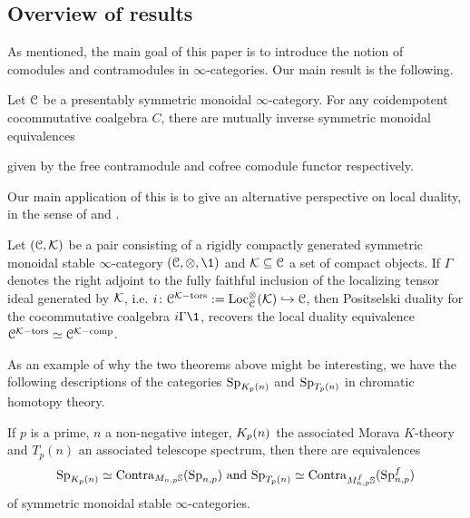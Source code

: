 \subsection*{Overview of results}

As mentioned, the main goal of this paper is to introduce the notion of comodules and contramodules in $\infty$-categories. Our main result is the following. 

\begin{introthm}
    \label{ch2:introthm:A}
    Let $\EuScript{C}$ be a presentably symmetric monoidal $\infty$-category. For any coidempotent cocommutative coalgebra $C$, there are mutually inverse symmetric monoidal equivalences
    \begin{center}
    \end{center}
    given by the free contramodule and cofree comodule functor respectively. 
\end{introthm}

Our main application of this is to give an alternative perspective on local duality, in the sense of \cite{hovey-palmiery-strickland_97} and \cite{barthel-heard-valenzuela_2018}. 

\begin{introthm}
    \label{ch2:introthm:B}
    Let $(\EuScript{C}, \mathcal{K})$ be a pair consisting of a rigidly compactly generated symmetric monoidal stable $\infty$-category $(\C, \otimes, \1)$ and $\mathcal{K}\subseteq \EuScript{C}$ a set of compact objects. If $\Gamma$ denotes the right adjoint to the fully faithful inclusion of the localizing tensor ideal generated by $\mathcal{K}$, i.e. $i\colon\EuScript{C}^{\mathcal{K}-\mathrm{tors}}:= \operatorname{Loc}_{\EuScript{C}}^\otimes (\mathcal{K})\hookrightarrow \EuScript{C}$, then Positselski duality for the cocommutative coalgebra $i\Gamma \1$, recovers the local duality equivalence $\EuScript{C}^{\mathcal{K}-\mathrm{tors}} \simeq \EuScript{C}^{\mathcal{K}-\mathrm{comp}}$. 
\end{introthm}

As an example of why the two theorems above might be interesting, we have the following descriptions of the categories $\mathrm{Sp}_{K_p(n)}$ and $\mathrm{Sp}_{T_p(n)}$ in chromatic homotopy theory. 

\begin{introcor}
    If $p$ is a prime, $n$ a non-negative integer, ${K_p(n)}$ the associated Morava $K$-theory and $T_p(n)$ an associated telescope spectrum, then there are equivalences 
    \[\mathrm{Sp}_{{K_p(n)}}\simeq \mathrm{Contra}_{M_{n,p}\mathbb{S}}(\mathrm{Sp}_{n,p}) \text{ and } \mathrm{Sp}_{T_p(n)}\simeq \mathrm{Contra}_{M_{n,p}^f \mathbb{S}}(\mathrm{Sp}_{n,p}^f)\]
    of symmetric monoidal stable $\infty$-categories. 
\end{introcor}



